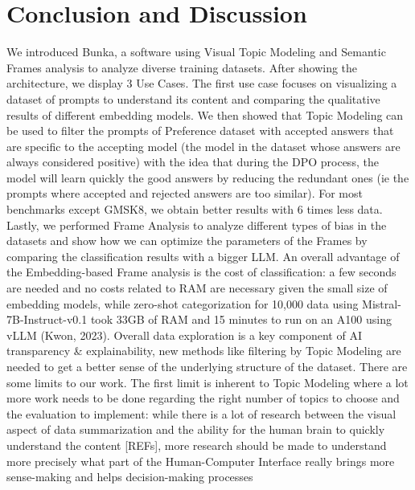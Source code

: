 \documentclass{article}
\begin{document}
\FloatBarrier %


\section{Conclusion and Discussion}

We introduced Bunka, a software using Visual Topic Modeling and Semantic Frames analysis to analyze diverse training datasets. After showing the architecture, we display 3 Use Cases. The first use case focuses on visualizing a dataset of prompts to understand its content and comparing the qualitative results of different embedding models. We then showed that Topic Modeling can be used to filter the prompts of Preference dataset with accepted answers that are specific to the accepting model (the model in the dataset whose answers are always considered positive) with the idea that during the DPO process, the model will learn quickly the good answers by reducing the redundant ones (ie the prompts where accepted and rejected answers are too similar). For most benchmarks except GMSK8, we obtain better results with 6 times less data. Lastly, we performed Frame Analysis to analyze different types of bias in the datasets and show how we can optimize the parameters of the Frames by comparing the classification results with a bigger LLM. An overall advantage of the Embedding-based Frame analysis is the cost of classification: a few seconds are needed and no costs related to RAM are necessary given the small size of embedding models, while zero-shot categorization for 10,000 data using Mistral-7B-Instruct-v0.1 took 33GB of RAM and 15 minutes to run on an A100 using vLLM (Kwon, 2023). Overall data exploration is a key component of AI transparency \& explainability, new methods like filtering by Topic Modeling are needed to get a better sense of the underlying structure of the dataset.
There are some limits to our work. The first limit is inherent to Topic Modeling where a lot more work needs to be done regarding the right number of topics to choose and the evaluation to implement: while there is a lot of research between the visual aspect of data summarization and the ability for the human brain to quickly understand the content [REFs], more research should be made to understand more precisely what part of the Human-Computer Interface really brings more sense-making and helps decision-making processes
\end{document}
